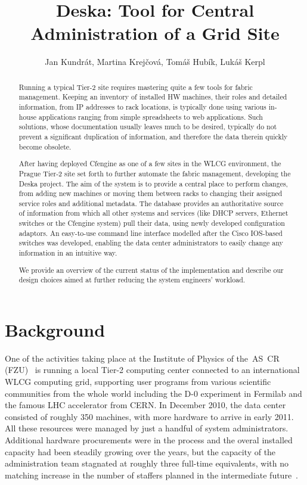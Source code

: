 \documentclass[a4paper]{jpconf}
\begin{document}
\title{Deska: Tool for Central Administration of a Grid Site}
\author{Jan Kundrát, Martina Krejčová, Tomáš Hubík, Lukáš Kerpl}
\address{Institute of Physics, AS CR, Na Slovance 22, 182 21, Prague, Czech
Republic}

\begin{abstract}
Running a typical Tier-2 site requires mastering quite a few tools for fabric management. Keeping an inventory of installed HW
machines, their roles and detailed information, from IP addresses to rack locations, is typically done using various in-house
applications ranging from simple spreadsheets to web applications. Such solutions, whose documentation usually leaves much to be
desired, typically do not prevent a significant duplication of information, and therefore the data therein quickly become obsolete.

After having deployed Cfengine as one of a few sites in the WLCG environment, the Prague Tier-2 site set forth to further automate the
fabric management, developing the Deska project. The aim of the system is to provide a central place to perform changes, from adding
new machines or moving them between racks to changing their assigned service roles and additional metadata. The database provides an
authoritative source of information from which all other systems and services (like DHCP servers, Ethernet switches or the Cfengine
system) pull their data, using newly developed configuration adaptors. An easy-to-use command line interface modelled after the Cisco
IOS-based switches was developed, enabling the data center administrators to easily change any information in an intuitive way.

We provide an overview of the current status of the implementation and describe our design choices aimed at further reducing the system
engineers' workload.
\end{abstract}

\section{Background}

One of the activities taking place at the Institute of Physics of the~AS~CR (FZU)~\cite{fzu} is running a local Tier-2 computing center
connected to an international WLCG computing grid, supporting user programs from various scientific communities from the whole world
including the D-0 experiment in Fermilab and the famous LHC accelerator from CERN.  In December 2010, the data center consisted of
roughly 350 machines, with more hardware to arrive in early 2011.  All these resources were managed by just a handful of system
administrators.  Additional hardware procurements were in the process and the overal installed capacity had been steadily growing over
the years, but the capacity of the administration team stagnated at roughly three full-time equivalents, with no matching increase in
the number of staffers planned in the intermediate future~\cite{dubna-kundrat}.
\end{document}
